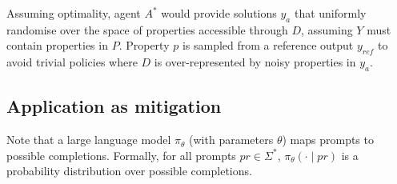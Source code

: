 Assuming optimality, agent $A^*$ would provide solutions $y_a$ that uniformly randomise over the space of properties accessible through $D$, assuming $Y$ must contain properties in $P$. Property $p$ is sampled from a reference output $y_{ref}$ to avoid trivial policies where $D$ is over-represented by noisy properties in $y_a$.


\subsection{Application as mitigation}

Note that a large language model $\pi_\theta$ (with parameters $\theta$) maps prompts to possible completions. Formally, for all prompts $pr \in \Sigma^*$, $\pi_\theta(\cdot \mid pr)$ is a probability distribution over possible completions. 

